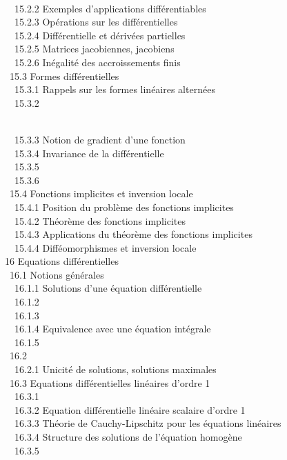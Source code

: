 \documentclass[]{article}
\begin{document}
\\ ~~15.2.2 {Exemples
d'applications différentiables} \\ ~~15.2.3
{Opérations sur les
différentielles} \\ ~~15.2.4
{Différentielle et dérivées
partielles} \\ ~~15.2.5
{Matrices jacobiennes,
jacobiens} \\ ~~15.2.6
{Inégalité des accroissements
finis} \\ ~15.3 {Formes
différentielles} \\ ~~15.3.1
{Rappels sur les formes
linéaires alternées} \\ ~~15.3.2

\\ ~~15.3.3 {Notion de gradient
d'une fonction} \\ ~~15.3.4
{Invariance de la
différentielle} \\ ~~15.3.5
 \\
~~15.3.6 
\\ ~15.4 {Fonctions implicites et
inversion locale} \\ ~~15.4.1
{Position du problème des
fonctions implicites} \\ ~~15.4.2
{Théorème des fonctions
implicites} \\ ~~15.4.3
{Applications du théorème des
fonctions implicites} \\ ~~15.4.4
{Difféomorphismes et inversion
locale} \\ 16 {Equations
différentielles} \\ ~16.1 {Notions
générales} \\ ~~16.1.1
{Solutions d'une équation
différentielle} \\ ~~16.1.2
 \\ ~~16.1.3
 \\
~~16.1.4 {Equivalence avec une
équation intégrale} \\ ~~16.1.5
 \\ ~16.2
 \\
~~16.2.1 {Unicité de solutions,
solutions maximales} \\ ~16.3
{Equations différentielles
linéaires d'ordre 1} \\ ~~16.3.1
 \\ ~~16.3.2
{Equation différentielle
linéaire scalaire d'ordre 1} \\ ~~16.3.3
{Théorie de Cauchy-Lipschitz
pour les équations linéaires} \\ ~~16.3.4
{Structure des solutions de
l'équation homogène} \\ ~~16.3.5
\end{document}
